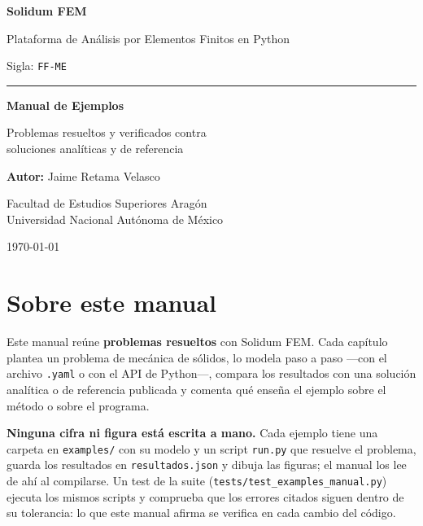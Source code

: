 \documentclass[11pt,oneside]{report}
\begin{document}

\begin{titlepage}
    \centering
    \vspace*{2cm}
    {\Huge\bfseries\color{yamlkey} Solidum FEM \par}
    \vspace{1cm}
    {\LARGE Plataforma de Análisis por Elementos Finitos en Python \par}
    \vspace{0.3cm}
    {\normalsize\color{darkgray} Sigla: \texttt{FF-ME} \par}
    \vspace{0.5cm}
    \rule{\linewidth}{0.5mm} \par
    \vspace{2cm}
    {\huge\bfseries Manual de Ejemplos \par}
    \vspace{2cm}
    {\large Problemas resueltos y verificados contra\\
            soluciones analíticas y de referencia\par}
    \vspace{1cm}
    {\Large \textbf{Autor:} Jaime Retama Velasco \par}
    \vspace{0.5cm}
    {\large Facultad de Estudios Superiores Aragón \\ Universidad Nacional Autónoma de México \par}
    \vfill
    {\large \today \par}
\end{titlepage}

\setcounter{page}{1}
\tableofcontents
\newpage

\chapter*{Sobre este manual}
\noindent Este manual reúne \textbf{problemas resueltos} con Solidum FEM. Cada capítulo plantea un problema de mecánica de sólidos, lo modela paso a paso ---con el archivo \texttt{.yaml} o con el API de Python---, compara los resultados con una solución analítica o de referencia publicada y comenta qué enseña el ejemplo sobre el método o sobre el programa.

\textbf{Ninguna cifra ni figura está escrita a mano.} Cada ejemplo tiene una carpeta en \texttt{examples/} con su modelo y un script \texttt{run.py} que resuelve el problema, guarda los resultados en \texttt{resultados.json} y dibuja las figuras; el manual los lee de ahí al compilarse. Un test de la suite (\texttt{tests/test\_examples\_manual.py}) ejecuta los mismos scripts y comprueba que los errores citados siguen dentro de su tolerancia: lo que este manual afirma se verifica en cada cambio del código.
\end{document}
